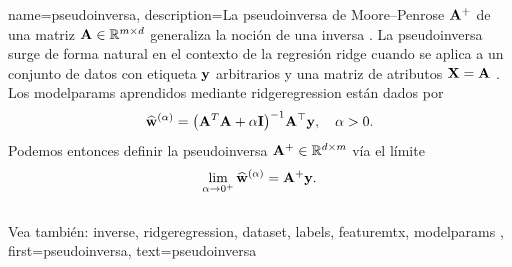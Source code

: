 

{name={pseudoinversa},
  description={La pseudoinversa de Moore–Penrose ${\bf A}^{+}$ 
  de una matriz ${\bf A} \in \mathbb{R}^{m \times d}$ generaliza la 
  noción de una inversa \cite{GolubVanLoanBook}. La pseudoinversa surge de forma natural 
  en el contexto de la regresión ridge cuando se aplica a un conjunto de datos con etiqueta ${\bf y}$ 
  arbitrarios y una matriz de atributos ${\bf X} = {\bf A}$ \cite[Cap.\ 3]{hastie01statisticallearning}. 
  Los \gls{modelparams} aprendidos mediante \gls{ridgeregression} están dados por
  	\[
  	\widehat{{\bf w}}^{(\alpha)}  = \big({\bf A}^T {\bf A} + \alpha \mathbf{I} \big)^{-1} {\bf A}^\top {\bf y}, \quad \alpha > 0.
  	\]
  	Podemos entonces definir la pseudoinversa ${\bf A}^+ \in \mathbb{R}^{d \times m}$ vía 
  	el límite \cite[Cap. 3]{benisrael2003generalized}
  	\[
  	\lim_{\alpha \to 0^+} \widehat{{\bf w}}^{(\alpha)} = {\bf A}^+ {\bf y}.
  	\]
	  \\
	  Vea también: \gls{inverse}, \gls{ridgeregression}, \gls{dataset}, \glspl{label}, \gls{featuremtx}, \gls{modelparams} },
 	first={pseudoinversa},
 	text={pseudoinversa}
 }



